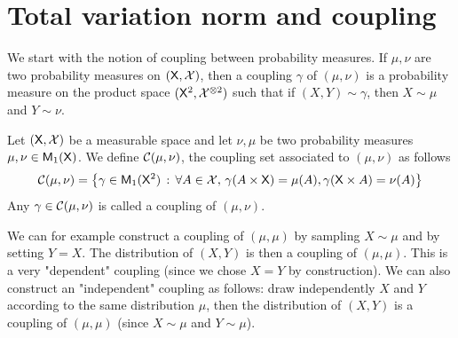 \documentclass[english,graybox,envcountchap,envcountsame,sectrefs,shortlabels]{svmono}
\theoremstyle{style}
\begin{document}
\section{Total variation norm and coupling}
We start with the notion of coupling between probability measures.
If $\mu,\nu$ are two probability measures on $(\mathsf{X},\mathcal{X})$, then a coupling $\gamma$ of $(\mu,\nu)$ is a probability measure on the product space $(\mathsf{X}^2,\mathcal{X}^{\otimes 2})$ such that if $(X,Y) \sim \gamma$, then  $X\sim\mu$ and $Y\sim \nu$.
\begin{definition}
Let $(\mathsf{X},\mathcal{X})$ be a measurable space and let $\nu,\mu$ be two probability measures $\mu,\nu \in \mathsf{M}_{1}(\mathsf{X})$. We define $\mathcal{C}(\mu,\nu)$, the coupling set associated to $(\mu,\nu)$ as follows
$$
\mathcal{C}(\mu,\nu)=\left\{ \gamma\in\mathsf{M}_{1}(\mathsf{X}^2)\,:\,\forall A\in\mathcal{X},\, \gamma(A\times\mathsf{X})=\mu(A), \gamma(\mathsf{X}\times A)=\nu(A)\right\}
$$
Any $\gamma\in\mathcal{C}(\mu,\nu)$ is called a coupling of $(\mu,\nu)$.
\end{definition}


We can for example construct a coupling of $(\mu,\mu)$ by sampling $X\sim\mu$ and by setting $Y=X$. The distribution of $(X,Y)$ is then a coupling of $(\mu,\mu)$. This is a very "dependent" coupling (since we chose $X=Y$ by construction). We can also construct an "independent" coupling as follows: draw independently $X$ and $Y$ according to the same distribution $\mu$, then the distribution of $(X,Y)$ is a coupling of $(\mu,\mu)$ (since $X\sim \mu$ and $Y\sim \mu$).

\end{document}
